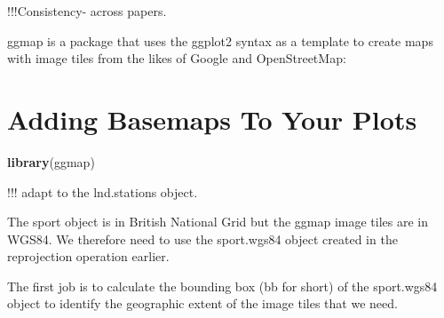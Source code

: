 \documentclass[]{article}
\newenvironment{Shaded}{}{}
\newcommand{\KeywordTok}[1]{\textcolor[rgb]{0.00,0.44,0.13}{\textbf{{#1}}}}
\newcommand{\NormalTok}[1]{{#1}}
\begin{document}
!!!Consistency- across papers.

ggmap is a package that uses the ggplot2 syntax as a template to create
maps with image tiles from the likes of Google and OpenStreetMap:

\section{Adding Basemaps To Your Plots}

\begin{Shaded}
\begin{Highlighting}[]
\KeywordTok{library}\NormalTok{(ggmap)}
\end{Highlighting}
\end{Shaded}
!!! adapt to the lnd.stations object.

The sport object is in British National Grid but the ggmap image tiles
are in WGS84. We therefore need to use the sport.wgs84 object created in
the reprojection operation earlier.

The first job is to calculate the bounding box (bb for short) of the
sport.wgs84 object to identify the geographic extent of the image tiles
that we need.
\end{document}
